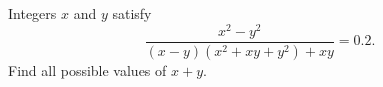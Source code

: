 Integers $x$ and $y$ satisfy
\[\dfrac{x^2-y^2}{(x-y)\left(x^2+xy+y^2\right)+xy}=0.2.\]
Find all possible values of $x+y$.
